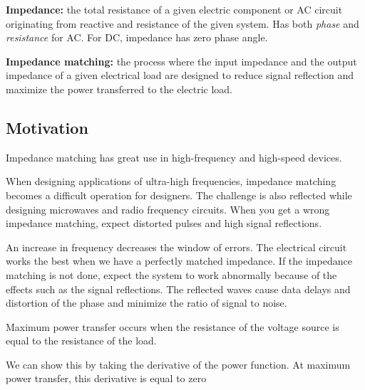 \begin{pline}
    \item \textbf{Impedance:} the total resistance of a given electric component or AC circuit originating from reactive and resistance of the given system. Has both \textit{phase} and \textit{resistance} for AC. For DC, impedance has zero phase angle.
    \item \textbf{Impedance matching:} the process where the input impedance and the output impedance of a given electrical load are designed to reduce signal reflection and maximize the power transferred to the electric load.
\end{pline}

\subsection{Motivation}
Impedance matching has great use in high-frequency and high-speed devices. 

When designing applications of ultra-high frequencies, impedance matching becomes a difficult operation for designers. The challenge is also reflected while designing microwaves and radio frequency circuits. When you get a wrong impedance matching, expect distorted pulses and high signal reflections.

An increase in frequency decreases the window of errors. The electrical circuit works the best when we have a perfectly matched impedance. If the impedance matching is not done, expect the system to work abnormally because of the effects such as the signal reflections. The reflected waves cause data delays and distortion of the phase and minimize the ratio of signal to noise.

\begin{pline}
    \item Maximum power transfer occurs when the resistance of the voltage source is equal to the resistance of the load.
\end{pline}

We can show this by taking the derivative of the power function. At maximum power transfer, this derivative is equal to zero


